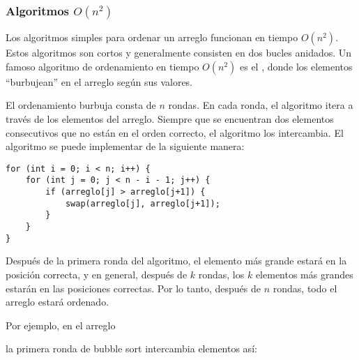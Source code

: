 \subsubsection{Algoritmos $O(n^2)$}


Los algoritmos simples para ordenar un arreglo
funcionan en tiempo $O(n^2)$.
Estos algoritmos son cortos y generalmente
consisten en dos bucles anidados.
Un famoso algoritmo de ordenamiento en tiempo $O(n^2)$
es el , donde los elementos
``burbujean'' en el arreglo según sus valores.

El ordenamiento burbuja consta de $n$ rondas.
En cada ronda, el algoritmo itera a través
de los elementos del arreglo.
Siempre que se encuentran dos elementos consecutivos
que no están en el orden correcto,
el algoritmo los intercambia.
El algoritmo se puede implementar de la siguiente manera:
\begin{lstlisting}
for (int i = 0; i < n; i++) {
    for (int j = 0; j < n - i - 1; j++) {
        if (arreglo[j] > arreglo[j+1]) {
            swap(arreglo[j], arreglo[j+1]);
        }
    }
}
\end{lstlisting}

Después de la primera ronda del algoritmo,
el elemento más grande estará en la posición correcta,
y en general, después de $k$ rondas, los $k$ elementos más grandes
estarán en las posiciones correctas.
Por lo tanto, después de $n$ rondas, todo el arreglo
estará ordenado.

Por ejemplo, en el arreglo

\begin{center}
\end{center}

\noindent
la primera ronda de bubble sort intercambia elementos así:

\begin{center}
\end{center}

